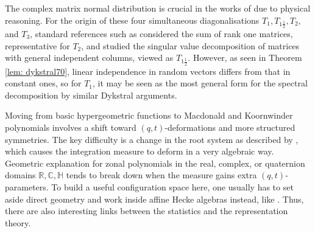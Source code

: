 \documentclass{amsart}
\theoremstyle{definition}
\numberwithin{equation}{section}
\begin{document}
The complex matrix normal distribution is crucial in the works of \cite{dyson1962statistical} due to physical reasoning. For the origin of these four simultaneous diagonalisations $T_1,T_{1\frac{1}{2}},T_2,$ and $T_3$, standard references such as \cite{Pajor2009OnTL} considered the sum of rank one matrices, representative for $T_{2}$, and \cite{Mei2021OnSV} studied the singular value decomposition of matrices with general independent columns, viewed as $T_{1\frac{1}{2}}$. However, as seen in Theorem \ref{lem: dykstral70}, linear independence in random vectors differs from that in constant ones, so for $T_1$, it may be seen as the most general form for the spectral decomposition by similar Dykstral arguments. %



Moving from basic hypergeometric functions to Macdonald and Koornwinder polynomials involves a shift toward $(q,t)$-deformations and more structured symmetries. The key difficulty is a change in the root system as described by \cite{Opdam1989}, which causes the integration measure to deform in a very algebraic way. Geometric explanation for zonal polynomials in the real, complex, or quaternion domains $\mathbb R, \mathbb C, \mathbb H$ tends to break down when the measure gains extra $(q,t)$-parameters. To build a useful configuration space here, one usually has to set aside direct geometry and work inside affine Hecke algebras instead, like \cite{macdonald2003affine}. Thus, there are also interesting links between the statistics and the representation theory.





\end{document}
